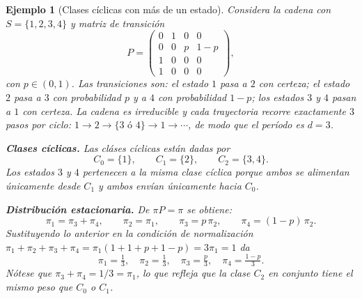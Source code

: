 \documentclass[12pt]{book}
\newtheorem{example}{Ejemplo}[chapter]
\begin{document}
\begin{example}[Clases cíclicas con más de un estado]
    Considera la cadena con $S = \{1, 2, 3, 4\}$ y matriz de transición
    \[
        P = \begin{pmatrix}
            0 & 1   & 0   & 0   \\
            0 & 0   & p   & 1-p \\
            1 & 0   & 0   & 0   \\
            1 & 0   & 0   & 0
        \end{pmatrix},
    \]
    con $p \in (0,1)$. Las transiciones son: el estado $1$ pasa a $2$ con certeza; el estado $2$ pasa a $3$ con probabilidad $p$ y a $4$ con probabilidad $1-p$; los estados $3$ y $4$ pasan a $1$ con certeza. La cadena es irreducible y cada trayectoria recorre exactamente $3$ pasos por ciclo: $1\to 2\to\{3\text{ ó }4\}\to 1\to\cdots$, de modo que el período es $d=3$.

    \smallskip
    \textbf{Clases cíclicas.} Las cláses cíclicas están dadas por
    \[
        C_0 = \{1\}, \qquad C_1 = \{2\}, \qquad C_2 = \{3, 4\}.
    \]
    Los estados $3$ y $4$ pertenecen a la misma clase cíclica porque ambos se alimentan únicamente desde $C_1$ y ambos envían únicamente hacia $C_0$.

    \smallskip
    \textbf{Distribución estacionaria.} De $\pi P = \pi$ se obtiene:
    \[
        \pi_1 = \pi_3 + \pi_4, \qquad \pi_2 = \pi_1, \qquad
        \pi_3 = p\,\pi_2, \qquad \pi_4 = (1-p)\,\pi_2.
    \]
    Sustituyendo lo anterior en la condición de normalización $\pi_1+\pi_2+\pi_3+\pi_4 = \pi_1(1+1+p+1-p) = 3\pi_1 = 1$ da
    \[
        \pi_1 = \tfrac{1}{3}, \quad \pi_2 = \tfrac{1}{3}, \quad
        \pi_3 = \tfrac{p}{3}, \quad \pi_4 = \tfrac{1-p}{3}.
    \]
    Nótese que $\pi_3 + \pi_4 = 1/3 = \pi_1$, lo que refleja que la clase $C_2$ en conjunto tiene el mismo peso que $C_0$ o $C_1$.


\end{example}
\end{document}
